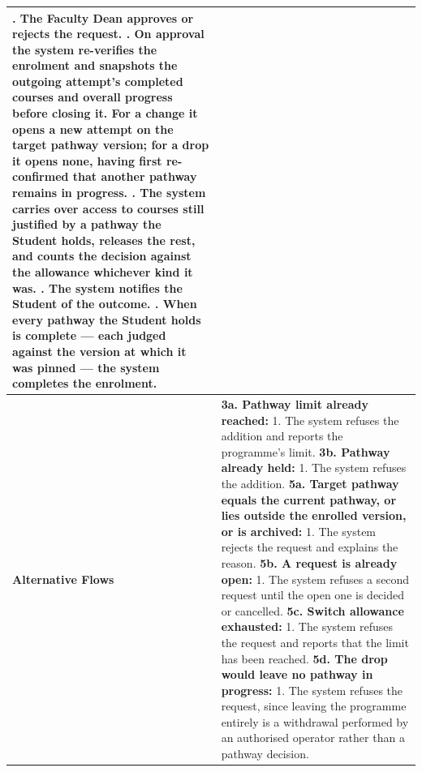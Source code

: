\begin{longtable}{|>{\raggedright\arraybackslash}p{}|>{\raggedright\arraybackslash}p{}|}
8. The Faculty Dean approves or rejects the request. \newline
9. On approval the system re-verifies the enrolment and snapshots the outgoing attempt's completed courses and overall progress before closing it. For a change it opens a new attempt on the target pathway version; for a drop it opens none, having first re-confirmed that another pathway remains in progress. \newline
10. The system carries over access to courses still justified by a pathway the Student holds, releases the rest, and counts the decision against the allowance whichever kind it was. \newline
11. The system notifies the Student of the outcome. \newline
12. When every pathway the Student holds is complete --- each judged against the version at which it was pinned --- the system completes the enrolment. \\ \hline
\textbf{Alternative Flows} &
\textbf{3a. Pathway limit already reached:} \newline
\hspace*{1em}1. The system refuses the addition and reports the programme's limit. \newline
\textbf{3b. Pathway already held:} \newline
\hspace*{1em}1. The system refuses the addition. \newline
\textbf{5a. Target pathway equals the current pathway, or lies outside the enrolled version, or is archived:} \newline
\hspace*{1em}1. The system rejects the request and explains the reason. \newline
\textbf{5b. A request is already open:} \newline
\hspace*{1em}1. The system refuses a second request until the open one is decided or cancelled. \newline
\textbf{5c. Switch allowance exhausted:} \newline
\hspace*{1em}1. The system refuses the request and reports that the limit has been reached. \newline
\textbf{5d. The drop would leave no pathway in progress:} \newline
\hspace*{1em}1. The system refuses the request, since leaving the programme entirely is a withdrawal performed by an authorised operator rather than a pathway decision. \newline

\end{longtable}
